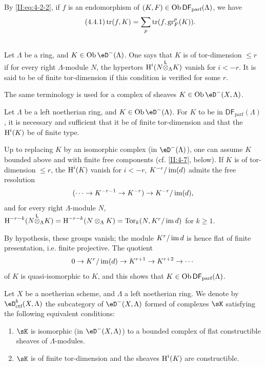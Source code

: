 By \eqref{II:eq:4-2-2}, if $f$ is an endomorphism of
$(K,F)\in\operatorname{Ob}\mathsf{DF}_\text{parf}(\Lambda)$, we have
\begin{equation*}\tag{4.4.1}\label{II:eq:4-4-1}
 \operatorname{tr}(f,K) = \sum_p \operatorname{tr}(f,\operatorname{gr}_F^p(K)) \text{.}
\end{equation*}




\subsection{}\label{II:4-5}

Let $\Lambda$ be a ring, and $K\in\ob\eD^-(\Lambda)$. One says that $K$ is of
tor-dimension $\leqslant r$ if for every right $\Lambda$-module $N$, the
hypertors $\operatorname{H}^i(N{\overset{\mathsf{L}}{\otimes}}_\Lambda K)$ vanish for $i<-r$. It is said to be of finite
tor-dimension if this condition is verified for some $r$.

The same terminology is used for a complex of sheaves
$K\in\ob\eD^-(X,\Lambda)$.




\begin{lemma}\label{II:4-5-1}
Let $\Lambda$ be a left noetherian ring, and $K\in\ob\eD^-(\Lambda)$.
For $K$ to be in $\mathsf{DF}_\text{parf}(\Lambda)$, it is necessary and sufficient
that it be of finite tor-dimension and that the $\operatorname{H}^i(K)$ be of finite type.
\end{lemma}

Up to replacing $K$ by an isomorphic complex (in $\eD^-(\Lambda)$), one
can assume $K$ bounded above and with finite free components
(cf. \ref{II:4-7}, below). If $K$ is of tor-dimension $\leqslant r$,
the $\operatorname{H}^i(K)$ vanish for $i<-r$, $K^{-r}/\operatorname{im}(d)$ admits the free resolution
\[
  (\cdots \to K^{-r-1} \to K^{-r}) \to K^{-r}/\operatorname{im}(d) \text{,}
\]
and for every right $\Lambda$-module $N$,
$\operatorname{H}^{-r-k}(N{\overset{\mathsf{L}}{\otimes}}_\Lambda K) = \operatorname{H}^{-r-k}(N\otimes_\Lambda K)
= \operatorname{Tor}_k(N,K^r/\operatorname{im} d)$ for $k\geqslant 1$.

By hypothesis, these groups vanish; the module $K^r/\operatorname{im} d$ is hence flat of
finite presentation, i.e. finite projective. The quotient
\[
  0 \to K^r/\operatorname{im}(d) \to K^{r+1} \to K^{r+2}\to \cdots
\]
of $K$ is quasi-isomorphic to $K$, and this shows that
$K\in\operatorname{Ob}\mathsf{DF}_\text{parf}(\Lambda)$.




\begin{prop-def_}\label{II:4-6}
Let $X$ be a noetherian scheme, and $\Lambda$ a left noetherian ring.
We denote by $\eD_\textnormal{ctf}^b(X,\Lambda)$ the subcategory of
$\eD^-(X,\Lambda)$ formed of complexes $\sK$ satisfying the following
equivalent conditions:
\begin{enumerate}[\indent i)]
  \item $\sK$ is isomorphic (in $\eD^-(X,\Lambda)$) to a bounded complex of
    flat constructible sheaves of $\Lambda$-modules.
  \item $\sK$ is of finite tor-dimension and the sheaves $\operatorname{H}^i(K)$ are
    constructible.
\end{enumerate}
\end{prop-def_}

